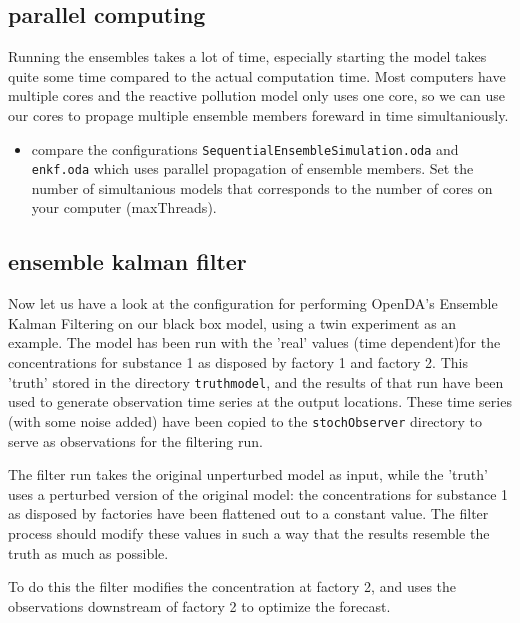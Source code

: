 \subsection{parallel computing}
Running the ensembles takes a lot of time, especially starting the model takes quite some time compared to the actual computation time. Most computers have multiple cores and the reactive pollution model only uses one core, so we can use our cores to propage multiple ensemble members foreward in time simultaniously. 
\begin{itemize}
	\item compare the configurations {\tt SequentialEnsembleSimulation.oda} and\\
		{\tt enkf.oda} which uses parallel propagation of ensemble members. Set the number of simultanious models that corresponds to the number of cores on your computer (maxThreads).
\end{itemize}

\subsection{ensemble kalman filter}


Now let us have a look at the configuration for performing OpenDA's Ensemble
Kalman Filtering on our black box model, using a twin experiment as an example.
The model has been run with the 'real' values (time dependent)for the
concentrations for substance 1 as disposed by factory 1 and factory 2. This
'truth' stored in the directory {\tt truthmodel}, and the results of that run
have been used to generate observation time series at the output locations.
These time series (with some noise added) have been copied to the {\tt stochObserver} directory to
serve as observations for the filtering run.

The filter run takes the original unperturbed model as input, while the 'truth' 
uses a perturbed version of the original model: the concentrations for substance 1 as disposed by
factories have been flattened out to a constant value. The filter process
should modify these values in such a way that the results resemble the truth as
much as possible.

To do this the filter modifies the concentration at factory 2, and uses the
observations downstream of factory 2 to optimize the forecast.

